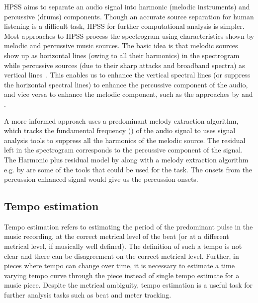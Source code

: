 \gls{HPSS} aims to separate an audio signal into harmonic (melodic instruments) and percussive (drums) components. Though an accurate source separation for human listening is a difficult task, \gls{HPSS} for further computational analysis is simpler. Most approaches to \gls{HPSS} process the spectrogram using characteristics shown by melodic and percussive music sources. The basic idea is that melodic sources show up as horizontal lines (owing to all their harmonics) in the spectrogram while percussive sources (due to their sharp attacks and broadband spectra) as vertical lines~\cite{fitzgerald:10:hpss}. This enables us to enhance the vertical spectral lines (or suppress the horizontal spectral lines) to enhance the percussive component of the audio, and vice versa to enhance the melodic component, such as the approaches by  and . 

A more informed approach uses a predominant melody extraction algorithm, which tracks the fundamental frequency (\fzero) of the audio signal to uses signal analysis tools to suppress all the harmonics of the melodic source. The residual left in the spectrogram corresponds to the percussive component of the signal. The Harmonic plus residual model by  along with a melody extraction algorithm e.g. by  are some of the tools that could be used for the task. The onsets from the percussion enhanced signal would give us the percussion onsets. 
\subsection{Tempo estimation}\label{sec:bkgnd:tempoest}
Tempo estimation refers to estimating the period of the predominant pulse in the music recording, at the correct metrical level of the beat (or at a different metrical level, if musically well defined). The definition of such a tempo is not clear and there can be disagreement on the correct metrical level. Further, in pieces where tempo can change over time, it is necessary to estimate a time varying tempo curve through the piece instead of single tempo estimate for a music piece. Despite the metrical ambiguity, tempo estimation is a useful task for further analysis tasks such as beat and meter tracking. 

